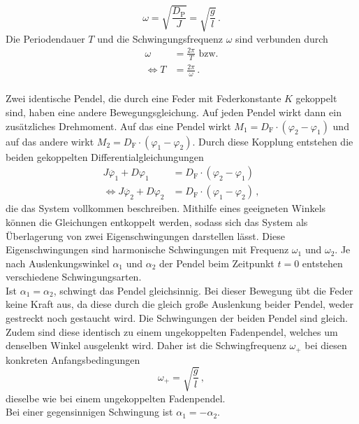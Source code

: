 \begin{equation*}
 \omega = \sqrt{\frac{D_{\text{P}}}{J}} = \sqrt{\frac{g}{l}}\, .
\end{equation*}
Die Periodendauer $T$ und die Schwingungsfrequenz $\omega$ sind verbunden durch 
\begin{align}
    \omega &= \frac{2 \pi}{T} \,\,\text{bzw.} \label{eqn:VerbindungOmegaT}\\
    \Leftrightarrow T &= \frac{2 \pi}{\omega} \label{eqn:VerbindungTOmega}\, .
\end{align}
\\
Zwei identische Pendel, die durch eine Feder mit Federkonstante $K$ gekoppelt sind, haben eine andere Bewegungsgleichung. 
Auf jeden Pendel wirkt dann ein zusätzliches Drehmoment. Auf das eine Pendel wirkt $M_1 = D_{\text{F}} \cdot (\varphi_2 - \varphi_1)$ 
und auf das andere wirkt $M_2 = D_{\text{F}} \cdot (\varphi_1 - \varphi_2)$. 
Durch diese Kopplung entstehen die beiden gekoppelten Differentialgleichungungen
\begin{align*}
J \ddot{\varphi_1} + D \varphi_1 &= D_{\text{F}} \cdot \left( \varphi_{2} - \varphi_{1} \right) \\
\Leftrightarrow J \ddot{\varphi_2} + D \varphi_2 &= D_{\text{F}} \cdot \left( \varphi_{1} - \varphi_{2} \right) \, ,
\end{align*}
die das System vollkommen beschreiben.
Mithilfe eines geeigneten Winkels können die Gleichungen entkoppelt werden, sodass sich das System als Überlagerung von zwei Eigenschwingungen darstellen lässt. 
Diese Eigenschwingungen sind harmonische Schwingungen mit Frequenz $\omega_{1}$ und $\omega_{2}$. 
Je nach Auslenkungswinkel $\alpha_1$ und $\alpha_2$ der Pendel beim Zeitpunkt $t = 0$ entstehen verschiedene Schwingungsarten. 
\\
Ist $\alpha_1 = \alpha_2$, schwingt das Pendel gleichsinnig. Bei dieser Bewegung übt die Feder keine Kraft aus, da diese durch die gleich große Auslenkung beider
Pendel, weder gestreckt noch gestaucht wird. Die Schwingungen der beiden Pendel sind gleich. Zudem sind diese identisch zu einem ungekoppelten Fadenpendel, welches um 
denselben Winkel ausgelenkt wird. Daher ist die Schwingfrequenz $\omega_+$ bei diesen konkreten Anfangsbedingungen 
\begin{equation}
    \omega_+ = \sqrt{\frac{g}{l}}\, ,
    \label{eqn:OmegaGleichsinnig}
\end{equation}
dieselbe wie bei einem ungekoppelten Fadenpendel. \\
Bei einer gegensinnigen Schwingung ist $\alpha_1 = - \alpha_2$. 
